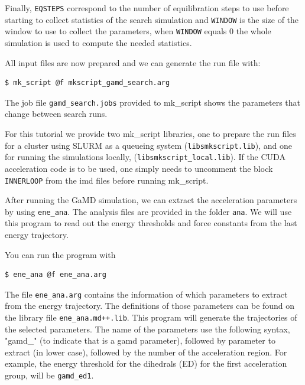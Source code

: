 Finally, \texttt{EQSTEPS}  correspond to the number of equilibration steps to use before starting to collect statistics of the search simulation and \texttt{WINDOW} is the size of the window to use to collect the parameters, when \texttt{WINDOW} equals 0 the whole simulation is used to compute the needed statistics.

All input files are now prepared and we can generate the run file with:
\begin{lstlisting}
$ mk_script @f mkscript_gamd_search.arg
\end{lstlisting}
The job file \texttt{gamd\_search.jobs} provided to mk\_script shows the parameters that change between search runs.

For this tutorial we provide two mk\_script libraries, one to prepare the run files for a cluster using SLURM as a queueing system (\texttt{libs\/mkscript.lib}), and one for running the simulations locally, (\texttt{libs\/mkscript\_local.lib}). If the CUDA acceleration code is to be used, one simply needs to uncomment the block \texttt{INNERLOOP} from the imd files before running mk\_script.

After running the GaMD simulation, we can extract the acceleration parameters by using \texttt{ene\_ana}. The analysis files are provided in the folder \texttt{ana}.
We will use this program to read out the energy thresholds and force constants from the last energy trajectory.

You can run the program with 
\begin{lstlisting}
$ ene_ana @f ene_ana.arg
\end{lstlisting}

The file \texttt{ene\_ana.arg} contains the information of which parameters to extract from the energy trajectory. The definitions of those parameters can be found on the library file \texttt{ene\_ana.md++.lib}. This program will generate the trajectories of the selected parameters. The name of the parameters use the following syntax, "gamd\_" (to indicate that is a gamd parameter), followed by parameter to extract (in lower case), followed by the number of the acceleration region. For example, the energy threshold for the dihedrals (ED) for the first acceleration group, will be \texttt{gamd\_ed1}.

